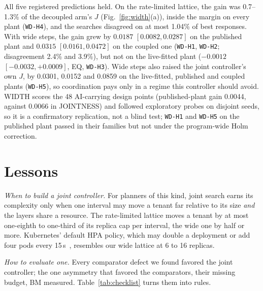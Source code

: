 \documentclass[conference,a4paper]{IEEEtran}
\newcommand{\rec}[1]{\texttt{\small #1}}
\begin{document}
All five registered predictions held. On the rate-limited lattice, the gain
was 0.7--1.3\% of the decoupled arm's $J$ (Fig.~\ref{fig:width}(a)), inside
the margin on every plant (\rec{WD-H4}), and the searches disagreed on at
most 1.04\% of best responses. With wide steps, the gain grew by $0.0187$
$[0.0082,0.0287]$ on the published plant and $0.0315$ $[0.0161,0.0472]$ on
the coupled one (\rec{WD-H1}, \rec{WD-H2}; disagreement 2.4\% and 3.9\%), but
not on the live-fitted plant ($-0.0012$ $[-0.0032,+0.0009]$, EQ,
\rec{WD-H3}). Wide steps also raised the joint controller's own $J$, by
0.0301, 0.0152 and 0.0859 on the live-fitted, published and coupled plants
(\rec{WD-H5}), so coordination pays only in a regime this controller should
avoid. WIDTH scores the 48 AI-carrying design points (published-plant gain
0.0044, against 0.0066 in JOINTNESS) and followed exploratory probes on
disjoint seeds, so it is a confirmatory replication, not a blind test;
\rec{WD-H1} and \rec{WD-H5} on the published plant passed in their families
but not under the program-wide Holm correction.

\section{Lessons}
\label{sec:lessons}

\textit{When to build a joint controller.} For planners of this kind, joint
search earns its complexity only when one interval may move a tenant far
relative to its size \emph{and} the layers share a resource. The rate-limited
lattice moves a tenant by at most one-eighth to one-third of its replica cap
per interval, the wide one by half or more. Kubernetes' default HPA policy,
which may double a deployment or add four pods every 15\,s~\cite{k8shpa},
resembles our wide lattice at 6 to 16 replicas.

\textit{How to evaluate one.} Every comparator defect we found favored the
joint controller; the one asymmetry that favored the comparators, their
missing budget, BM measured. Table~\ref{tab:checklist} turns them into rules.
\end{document}
